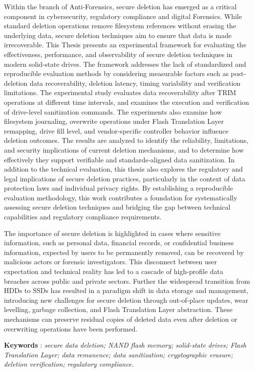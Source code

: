 

Within the branch of Anti-Forensics, secure deletion has emerged as a critical component in cybersecurity,
regulatory compliance and digital Forensics. While standard deletion operations remove filesystem
references without erasing the underlying data,  secure deletion techniques aim to ensure that data
is made irrecoverable. This Thesis presents an experimental framework for evaluating the effectiveness, performance, and observability 
of secure deletion techniques in modern solid-state drives. The framework addresses the lack of standardized 
and reproducible evaluation methods by considering measurable factors such as post-deletion data 
recoverability, deletion latency, timing variability and verification limitations. The experimental study  
evaluates data recoverability after TRIM operations at different time intervals, and examines the execution 
and verification of drive-level sanitization commands. The experiments also examine how filesystem journaling, 
overwrite operations under Flash Translation Layer remapping, drive fill level, and vendor-specific controller 
behavior influence deletion outcomes. The results are analyzed to identify the reliability, limitations, and security 
implications of current deletion mechanisms, and to determine how effectively they support verifiable and 
standards-aligned data sanitization. In addition to the technical evaluation, this thesis also explores the 
regulatory and legal implications of secure deletion practices, particularly in the context of data protection 
laws and individual privacy rights. By establishing a reproducible evaluation methodology, this work contributes a 
foundation for systematically assessing secure deletion techniques and bridging the gap between technical 
capabilities and regulatory compliance requirements.

The importance of secure deletion is highlighted in cases where sensitive 
information, such as personal data, financial records, or confidential business information, expected 
by users to be permanently removed, can be recovered by malicious actors or forensic investigators. This 
disconnect between user expectation and technical reality has led to a cascade of high-profile data 
breaches across public and private sectors. Further the widespread transition from HDDs to SSDs has
resulted in a paradigm shift in data storage and management, introducing new challenges for secure deletion
through out-of-place updates, wear levelling, garbage collection, and Flash Translation Layer abstraction. 
These mechanisms can preserve residual copies of deleted data even after deletion or overwriting operations 
have been performed.


\vspace{0.3cm}

\textbf{Keywords} : \textit{secure data deletion; NAND flash memory; solid-state drives; Flash Translation Layer; data remanence; data sanitization; cryptographic erasure; deletion verification; regulatory compliance.}